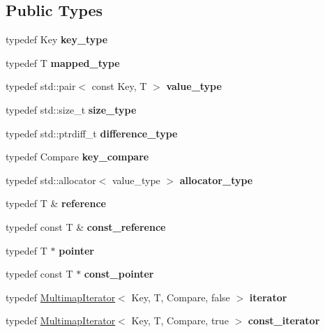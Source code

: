\subsection*{Public Types}
\begin{DoxyCompactItemize}
\item 
\mbox{\label{classMultimap_ae22db357048c65265607ed263469918d}} 
typedef Key {\bfseries key\+\_\+type}
\item 
\mbox{\label{classMultimap_a05f3a4a83bf4fc44da7d88ea3ef49ed5}} 
typedef T {\bfseries mapped\+\_\+type}
\item 
\mbox{\label{classMultimap_a0ed55c312df37a00f0e73e9c1e8b6c5a}} 
typedef std\+::pair$<$ const Key, T $>$ {\bfseries value\+\_\+type}
\item 
\mbox{\label{classMultimap_a0e34e37c96a3fac89b7f4356e009b68e}} 
typedef std\+::size\+\_\+t {\bfseries size\+\_\+type}
\item 
\mbox{\label{classMultimap_a26a14e64d590f53dc692a140e99c5def}} 
typedef std\+::ptrdiff\+\_\+t {\bfseries difference\+\_\+type}
\item 
\mbox{\label{classMultimap_a0c878dfdc488ba3bc9bff27e4ef74f17}} 
typedef Compare {\bfseries key\+\_\+compare}
\item 
\mbox{\label{classMultimap_a2896c71d81bb4299b7caba9df18ac617}} 
typedef std\+::allocator$<$ value\+\_\+type $>$ {\bfseries allocator\+\_\+type}
\item 
\mbox{\label{classMultimap_a1d37960f96bedba53634646633eb7943}} 
typedef T \& {\bfseries reference}
\item 
\mbox{\label{classMultimap_a315588177f9e7a0298b43c2accbdc090}} 
typedef const T \& {\bfseries const\+\_\+reference}
\item 
\mbox{\label{classMultimap_ae3dae15312101b0b6e43e5830261d297}} 
typedef T $\ast$ {\bfseries pointer}
\item 
\mbox{\label{classMultimap_a9a04e5deacadfdab82e96fb85fcc2624}} 
typedef const T $\ast$ {\bfseries const\+\_\+pointer}
\item 
\mbox{\label{classMultimap_a1411bc48d807b5d76f464c2b3b336cd5}} 
typedef \hyperlink{classMultimapIterator}{Multimap\+Iterator}$<$ Key, T, Compare, false $>$ {\bfseries iterator}
\item 
\mbox{\label{classMultimap_a66040479cb2f5724f3ee62565c95d099}} 
typedef \hyperlink{classMultimapIterator}{Multimap\+Iterator}$<$ Key, T, Compare, true $>$ {\bfseries const\+\_\+iterator}
\end{DoxyCompactItemize}
